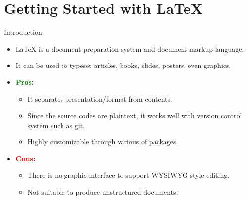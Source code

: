\section{Getting Started with \LaTeX}

\begin{frame}{Introduction}
  \begin{itemize}
    \item \alert{\LaTeX{}} is a document preparation system and document markup language.
    \item It can be used to typeset articles, books, slides, posters, even graphics.
    \item \textbf{\textcolor{Green}{Pros}:}
          \begin{itemize}
            \item It separates presentation/format from contents.
            \item Since the source codes are plaintext, it works well with version control system such as git.
            \item Highly customizable through various of packages.
          \end{itemize}
    \item \textbf{\textcolor{Red}{Cons}:}
          \begin{itemize}
            \item There is no graphic interface to support WYSIWYG style editing.
            \item Not suitable to produce unstructured documents.
          \end{itemize}
  \end{itemize}
\end{frame}

